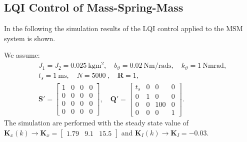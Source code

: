 \documentclass[11pt,a4paper,oneside]{book}
\numberwithin{equation}{section}
\theoremstyle{it}
\theoremstyle{definition}
\begin{document}
\subsection{LQI Control of Mass-Spring-Mass}
In the following the simulation results of the LQI control applied to the MSM 
system is shown.

We assume: 
\begin{equation*}
	\begin{aligned}
		& J_1 = J_2 = \SI{0.025}{\kilogram\square\meter},\quad
		b_{\vartheta} = \SI{0.02}{\newton\meter\per\radian\second},\quad 
		k_{\vartheta} = \SI{1}{\newton\meter\radian}, \\[6pt]
		& t_s=\SI{1}{\milli\second},\quad
		N = \SI{5000}{},\quad
		\mathbf{R}=1, \\[6pt]
		& \mathbf{S'}=\begin{bmatrix} 1&0&0&0\\0&0&0&0\\0&0&0&0\\0&0&0&0 
		\end{bmatrix},\quad
		\mathbf{Q'}=\begin{bmatrix} t_s&0&0&0\\0&1&0&0\\0&0&100&0\\0&0&0&1 
		\end{bmatrix}.
	\end{aligned}
\end{equation*}
The simulation are performed with the steady state value of 
$\mathbf{K}_x(k)\rightarrow\mathbf{K}_x = \begin{bmatrix} 1.79&9.1&15.5 
\end{bmatrix}$ and $\mathbf{K}_I(k)\rightarrow\mathbf{K}_I = -0.03$.
\end{document}
